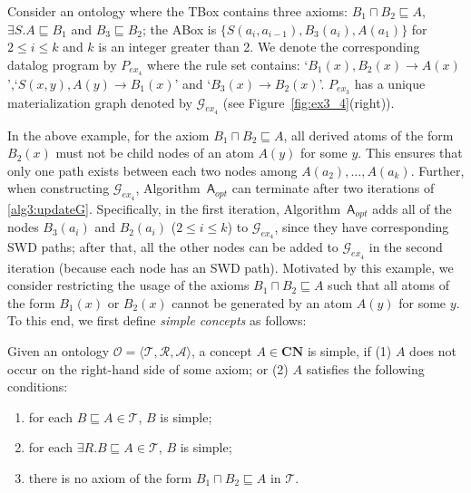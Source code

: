 \documentclass[final,1p,times]{elsarticle}
\begin{document}
\begin{example}\label{exp:simpleC}
Consider an ontology where the TBox contains three axioms:
$B_1\sqcap B_2\sqsubseteq A$, $\exists S.A\sqsubseteq B_1$ and $B_3\sqsubseteq B_2$;
the ABox is $\{S(a_i,a_{i-1}), B_3(a_i), A(a_1)\}$
for $2\leq i\leq k$ and $k$ is an integer greater than 2.
We denote the corresponding datalog program by $P_{ex_4}$ where the rule set contains:
`$B_1(x),B_2(x)\rightarrow A(x)$',`$S(x,y),A(y)\rightarrow B_1(x)$' and `$B_3(x)\rightarrow B_2(x)$'.
$P_{ex_3}$ has a unique materialization graph denoted by $\mathcal{G}_{ex_4}$ (see Figure~\ref{fig:ex3_4}(right)).
\end{example}

In the above example, for the axiom $B_1\sqcap B_2\sqsubseteq A$, all derived atoms
of the form $B_2(x)$ must not be child nodes of an atom $A(y)$ for some $y$.
This ensures that only one path exists between each two nodes among $A(a_2),...,A(a_k)$.
Further, when constructing $\mathcal{G}_{ex_4}$, Algorithm~$\mathsf{A}_{opt}$ can terminate after
two iterations of \ref{alg3:updateG}. Specifically, in the first iteration, Algorithm~$\mathsf{A}_{opt}$
adds all of the nodes $B_3(a_i)$ and $B_2(a_i)$ ($2\leq i\leq k$) to $\mathcal{G}_{ex_4}$,
since they have corresponding SWD paths;
after that, all the other nodes
can be added to $\mathcal{G}_{ex_4}$ in the second iteration (because each
node has an SWD path).
Motivated by this example, we consider restricting the usage of
the axioms $B_1\sqcap B_2\sqsubseteq A$
such that all atoms of the form $B_1(x)$ or $B_2(x)$ cannot be generated by an atom $A(y)$
for some $y$.
To this end, we first define \emph{simple concepts} as follows:

\begin{definition}
Given an ontology $\mathcal{O}=\langle\mathcal{T},\mathcal{R},\mathcal{A}\rangle$,
a concept $A\in\textbf{CN}$ is simple, if (1) $A$ does not occur on the right-hand side
of some axiom; or (2) $A$ satisfies the following conditions:
\begin{enumerate}[leftmargin=4ex,label=\arabic*.]
\item for each $B\sqsubseteq A\in\mathcal{T}$, $B$ is simple;
\item for each $\exists R.B\sqsubseteq A\in\mathcal{T}$, $B$ is simple;
\item there is no axiom of the form $B_1\sqcap B_2\sqsubseteq A$ in $\mathcal{T}$.
\end{enumerate}
\end{definition}
\end{document}
